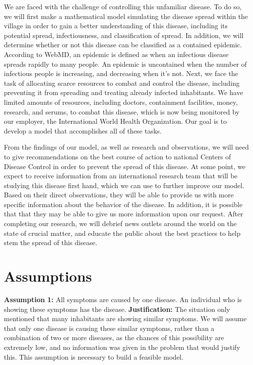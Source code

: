 \documentclass[12pt]{article}
\begin{document}
We are faced with the challenge of controlling this unfamiliar disease. To do so, we will first make a mathematical model simulating the disease spread within the village in order to gain a better understanding of this disease, including its potential spread, infectiousness, and classification of spread. In addition, we will determine whether or not this disease can be classified as a contained epidemic. According to WebMD, an epidemic is defined as when an infectious disease spreads rapidly to many people. An epidemic is uncontained when the number of infectious people is increasing, and decreasing when it’s not. Next, we face the task of allocating scarce resources to combat and control the disease, including preventing it from spreading and treating already infected inhabitants. We have limited amounts of resources, including doctors, containment facilities, money, research, and serums, to combat this disease, which is now being monitored by our employer, the International World Health Organization. Our goal is to develop a model that accomplishes all of these tasks.

From the findings of our model, as well as research and observations, we will need to give recommendations on the best course of action to national Centers of Disease Control in order to prevent the spread of this disease. At some point, we expect to receive information from an international research team that will be studying this disease first hand, which we can use to further improve our model. Based on their direct observations, they will be able to provide us with more specific information about the behavior of the disease. In addition, it is possible that that they may be able to give us more information upon our request. After completing our research, we will debrief news outlets around the world on the state of crucial matter, and educate the public about the best practices to help stem the spread of this disease.

\newpage
\section{Assumptions}
\textbf{Assumption 1:} All symptoms are caused by one disease. An individual who is showing these symptoms has the disease.
\newline
\textbf{Justification:} The situation only mentioned that many inhabitants are showing similar symptoms. We will assume that only one disease is causing these similar symptoms, rather than a combination of two or more diseases, as the chances of this possibility are extremely low, and no information was given in the problem that would justify this. This assumption is necessary to build a feasible model.
\end{document}
